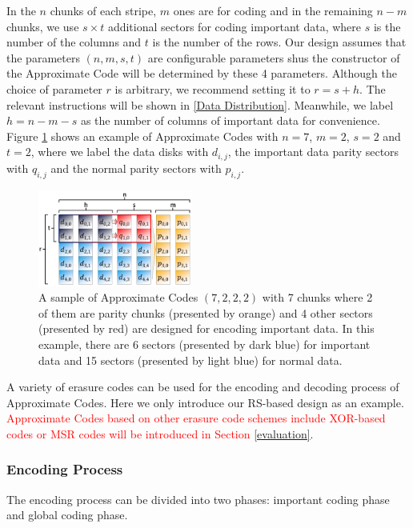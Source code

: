 \documentclass[sigconf]{acmart}
\begin{document}
In the $n$ chunks of each stripe, $m$ ones are for coding and in the remaining $n-m$ chunks, we use $s \times t$ additional sectors for coding important data, where $s$ is the number of the columns and $t$ is the number of the rows.
Our design assumes that the parameters  $(n, m, s,t)$ are configurable parameters shus the constructor of the Approximate Code will be determined by these 4 parameters.
Although the choice of parameter $r$ is arbitrary, we recommend setting it to $r=s+h$.
The relevant instructions will be shown in \ref{Data Distribution}.
Meanwhile, we label $h=n-m-s$ as the number of columns of important data for convenience.
Figure \ref{apcode-7222-v5} shows an example of Approximate Codes with $n = 7$, $m = 2$, $s=2$ and $t = 2$, where we label the data disks with $d_{i,j}$, the important data parity sectors with $q_{i,j}$ and the normal parity sectors with $p_{i,j}$. 

\begin{figure}[ht]
\centering
\includegraphics[width=0.45\textwidth]{photo/apcode-7222-v5.PDF}
\caption{A sample of Approximate Codes $(7,2,2,2)$ with 7 chunks where 2 of them are parity chunks (presented by orange) and 4 other sectors (presented by red) are designed for encoding important data. In this example, there are 6 sectors (presented by dark blue) for important data and 15 sectors (presented by light blue) for normal data.}
\label{apcode-7222-v5}
\end{figure}

A variety of erasure codes can be used for the encoding and decoding process of Approximate Codes. Here we only introduce our RS-based design as an example. 
\textcolor{red}{Approximate Codes based on other erasure code schemes include XOR-based codes or MSR codes will be introduced in Section }\ref{evaluation}.

\subsubsection{Encoding Process}
The encoding process can be divided into two phases: important coding phase and global coding phase.
\end{document}
